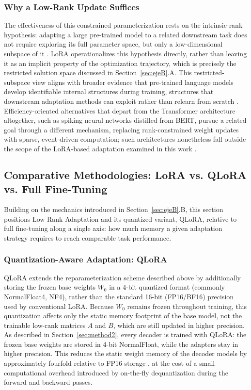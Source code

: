 \documentclass[conference]{IEEEtran}
\begin{document}
\subsubsection{Why a Low-Rank Update Suffices}
The effectiveness of this constrained parameterization rests on the intrinsic-rank hypothesis: adapting a large pre-trained model to a related downstream task does not require exploring its full parameter space, but only a low-dimensional subspace of it \cite{liu-etal-2026-look}. LoRA operationalizes this hypothesis directly, rather than leaving it as an implicit property of the optimization trajectory, which is precisely the restricted solution space discussed in Section~\ref{sec:ejeB}.A. This restricted-subspace view aligns with broader evidence that pre-trained language models develop identifiable internal structures during training, structures that downstream adaptation methods can exploit rather than relearn from scratch \cite{teehan2022emergent}. Efficiency-oriented alternatives that depart from the Transformer architecture altogether, such as spiking neural networks distilled from BERT, pursue a related goal through a different mechanism, replacing rank-constrained weight updates with sparse, event-driven computation; such architectures nonetheless fall outside the scope of the LoRA-based adaptation examined in this work \cite{lv2026spikebert}.

\subsection{Comparative Methodologies: LoRA vs. QLoRA vs. Full Fine-Tuning}

Building on the mechanics introduced in Section~\ref{sec:ejeB}.B, this section positions Low-Rank Adaptation and its quantized variant, QLoRA, relative to full fine-tuning along a single axis: how much memory a given adaptation strategy requires to reach comparable task performance.

\subsubsection{Quantization-Aware Adaptation: QLoRA}
QLoRA extends the reparameterization scheme described above by additionally storing the frozen base weights $W_0$ in a 4-bit quantized format (commonly NormalFloat4, NF4), rather than the standard 16-bit (FP16/BF16) precision used by conventional LoRA. Because $W_0$ remains frozen throughout training, this quantization affects only the static memory footprint of the base model, not the trainable low-rank matrices $A$ and $B$, which are still updated in higher precision. As described in Section~\ref{sec:method2}, every decoder is trained with QLoRA: the frozen base weights are stored in 4-bit NormalFloat, while the adapters stay in higher precision. This reduces the static weight memory of the decoder models by approximately fourfold relative to FP16 storage \cite{wang2025peft}, at the cost of a small computational overhead introduced by on-the-fly dequantization during the forward and backward passes.
\end{document}
